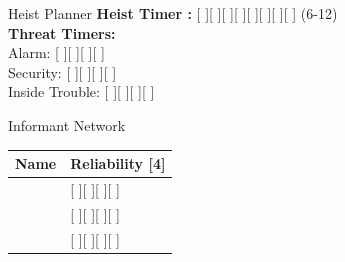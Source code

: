 \documentclass[10pt]{article}
\begin{document}
\begin{minipage}[t]{0.48\linewidth}
    \begin{charbox}{Heist Planner}
        \textbf{Heist Timer :} [ \hspace{0.3cm} ][ \hspace{0.3cm} ][ \hspace{0.3cm} ][ \hspace{0.3cm} ][ \hspace{0.3cm} ][ \hspace{0.3cm} ][ \hspace{0.3cm} ][ \hspace{0.3cm} ] (6-12)\\
        \textbf{Threat Timers:}\\
        Alarm: [ \hspace{0.3cm} ][ \hspace{0.3cm} ][ \hspace{0.3cm} ][ \hspace{0.3cm} ]\\
        Security: [ \hspace{0.3cm} ][ \hspace{0.3cm} ][ \hspace{0.3cm} ][ \hspace{0.3cm} ]\\
        Inside Trouble: [ \hspace{0.3cm} ][ \hspace{0.3cm} ][ \hspace{0.3cm} ][ \hspace{0.3cm} ]
    \end{charbox}
    
    \vspace{0.5em}
    
    \begin{charbox}{Informant Network}
        \begin{tabular}{p{3cm} p{3cm}}
            \textbf{Name} & \textbf{Reliability [4]} \\
            \hline
            \underline{\hspace{3cm}} & [ \hspace{0.3cm} ][ \hspace{0.3cm} ][ \hspace{0.3cm} ][ \hspace{0.3cm} ]\\
            \underline{\hspace{3cm}} & [ \hspace{0.3cm} ][ \hspace{0.3cm} ][ \hspace{0.3cm} ][ \hspace{0.3cm} ]\\
            \underline{\hspace{3cm}} & [ \hspace{0.3cm} ][ \hspace{0.3cm} ][ \hspace{0.3cm} ][ \hspace{0.3cm} ]\\
        \end{tabular}
    \end{charbox}
    

\end{minipage}
\end{document}
